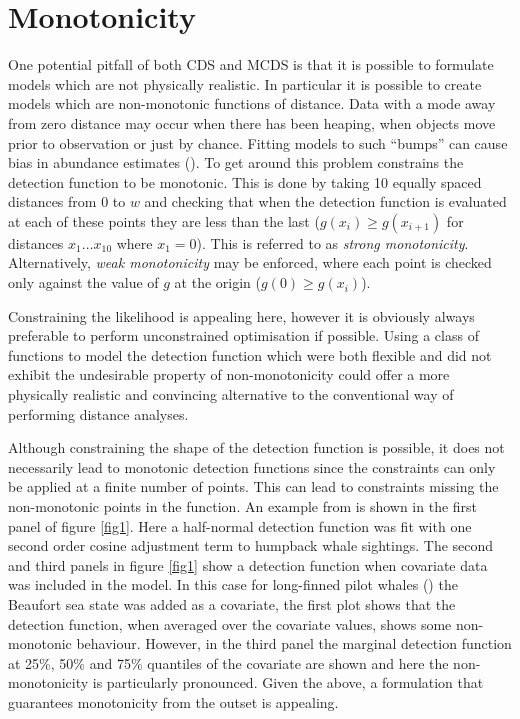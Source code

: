 \section{Monotonicity}
\label{intro-ds-mono}
One potential pitfall of both CDS and MCDS is that  it is possible to formulate models which are not physically realistic. In particular it is possible to create models which are non-monotonic functions of distance. Data with a mode away from zero distance may occur when there has been heaping, when objects move prior to observation or just by chance. Fitting models to such ``bumps'' can cause bias in abundance estimates (\cite[p. 132]{IDS}). To get around this problem  constrains the detection function to be monotonic. This is done by taking 10 equally spaced distances from $0$ to $w$ and checking that when the detection function is evaluated at each of these points they are less than the last ($g(x_i)\geq g(x_{i+1})$ for distances $x_1 \dots x_{10}$ where $x_1=0$). This is referred to as \textit{strong monotonicity}. Alternatively, \textit{weak monotonicity} may be enforced, where each point is checked only against the value of $g$ at the origin ($g(0)\geq g(x_i)$).

Constraining the likelihood is appealing here, however it is obviously always preferable to perform unconstrained optimisation if possible. Using a class of functions to model the detection function which were both flexible and did not exhibit the undesirable property of non-monotonicity could offer a more physically realistic and convincing alternative to the conventional way of performing distance analyses.

Although constraining the shape of the detection function is possible, it does not necessarily lead to monotonic detection functions since the constraints can only be applied at a finite number of points. This can lead to constraints missing the non-monotonic points in the function. An example from  is shown in the first panel of figure \ref{fig1}. Here a half-normal detection function was fit with one second order cosine adjustment term to humpback whale sightings. The second and third panels in figure \ref{fig1} show a detection function when covariate data was included in the model. In this case for long-finned pilot whales (\cite{pike}) the Beaufort sea state was added as a covariate, the first plot shows that the detection function, when averaged over the covariate values, shows some non-monotonic behaviour. However, in the third panel the marginal detection function at 25\%, 50\% and 75\% quantiles of the covariate are shown and here the non-monotonicity is particularly pronounced. Given the above, a formulation that guarantees monotonicity from the outset is appealing.

